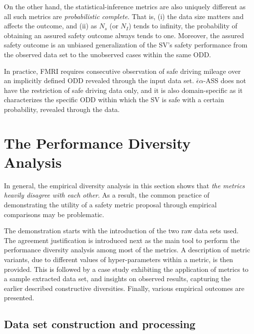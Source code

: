 \documentclass[journal]{IEEEtran}
\begin{document}
On the other hand, the statistical-inference metrics are also uniquely different as all such metrics are \emph{probabilistic complete}. That is, (i) the data size matters and affects the outcome, and (ii) as $N_s$ (or $N_I$) tends to infinity, the probability of obtaining an assured safety outcome always tends to one. Moreover, the assured safety outcome is an unbiased generalization of the SV's safety performance from the observed data set to the unobserved cases within the same ODD.

In practice, FMRI requires consecutive observation of safe driving mileage over an implicitly defined ODD revealed through the input data set. $\bar{\epsilon}\alpha$-ASS does not have the restriction of safe driving data only, and it is also domain-specific as it characterizes the specific ODD within which the SV is safe with a certain probability, revealed through the data. 

\section{The Performance Diversity Analysis}\label{sec:performance_da}
In general, the empirical diversity analysis in this section shows that \emph{the metrics heavily disagree with each other}. As a result, the common practice of demonstrating the utility of a safety metric proposal through empirical comparisons may be problematic.

The demonstration starts with the introduction of the two raw data sets used. The agreement justification is introduced next as the main tool to perform the performance diversity analysis among most of the metrics. A description of metric variants, due to different values of hyper-parameters within a metric, is then provided. This is followed by a case study exhibiting the application of metrics to a sample extracted data set, and insights on observed results, capturing the earlier described constructive diversities. Finally, various empirical outcomes are presented.

\subsection{Data set construction and processing}
\end{document}
